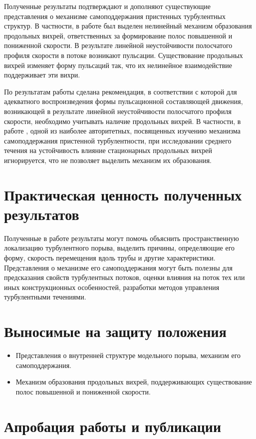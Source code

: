 Полученные результаты подтверждают и дополняют существующие представления о механизме самоподдержания пристенных турбулентных структур. В частности, в работе был выделен нелинейный механизм образования продольных вихрей, ответственных за формирование полос повышенной и пониженной скорости. В результате линейной неустойчивости полосчатого профиля скорости в потоке возникают пульсации. Существование продольных вихрей изменяет форму пульсаций так, что их нелинейное взаимодействие поддерживает эти вихри. 

По результатам работы сделана рекомендация, в соответствии с которой для адекватного воспроизведения формы пульсационной составляющей движения, возникающей в результате линейной неустойчивости полосчатого профиля скорости, необходимо учитывать наличие продольных вихрей. В частности, в работе \cite{Schoppa2002}, одной из наиболее авторитетных, посвященных изучению механизма самоподдержания пристенной турбулентности, при исследовании среднего течения на устойчивость влияние стационарных продольных вихрей игнорируется, что не позволяет выделить механизм их образования. 


\section{Практическая ценность полученных результатов}

Полученные в работе результаты могут помочь объяснить пространственную локализацию турбулентного порыва, выделить причины, определяющие его форму, скорость перемещения вдоль трубы и другие характеристики. Представления о механизме его самоподдержания могут быть полезны для предсказания свойств турбулентных потоков, оценки влияния на поток тех или иных конструкционных особенностей, разработки методов управления турбулентными течениями. 


\section{Выносимые на защиту положения}

\begin{itemize}
\item Представления о внутренней структуре модельного порыва, механизм его самоподдержания. 
\item Механизм образования продольных вихрей, поддерживающих существование полос повышенной и пониженной скорости. 
\end{itemize}

\section{Апробация работы и публикации}

